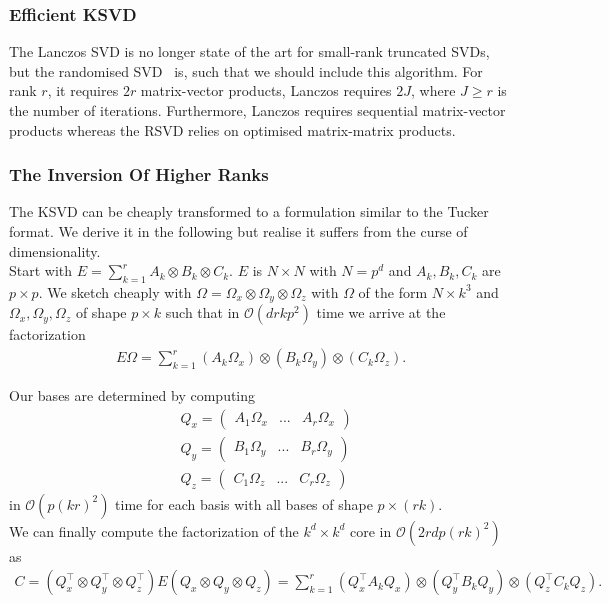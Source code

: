 \documentclass[12pt]{report}
\theoremstyle{remark}
\begin{document}
\subsubsection{Efficient KSVD}
The Lanczos SVD is no longer state of the art for small-rank truncated SVDs, but the randomised SVD~\cite{T23} is, such that we should include this algorithm. For rank $r$, it requires $2r$ matrix-vector products, Lanczos requires $2J$, where $J \geq r$ is the number of iterations. Furthermore, Lanczos requires sequential matrix-vector products whereas the RSVD relies on optimised matrix-matrix products.

\subsubsection{The Inversion Of Higher Ranks}
The KSVD can be cheaply transformed to a formulation similar to the Tucker format. We derive it in the following but realise it suffers from the curse of dimensionality. \\

Start with $E = \sum_{k=1}^r A_k \otimes B_k \otimes C_k$. $E$ is $N \times N$ with $N = p^d$ and $A_k, B_k, C_k$ are $p \times p$. We sketch cheaply with $\Omega = \Omega_x \otimes \Omega_y \otimes \Omega_z$ with $\Omega$ of the form $N \times k^3$ and $\Omega_x, \Omega_y, \Omega_z$ of shape $p \times k$ such that in $\mathcal{O}(dr k p^2)$ time we arrive at the factorization
\begin{align}
E \Omega = \sum_{k=1}^r (A_k \Omega_x) \otimes (B_k \Omega_y) \otimes (C_k \Omega_z).
\end{align}

Our bases are determined by computing
\begin{align*}
&Q_x = \begin{pmatrix}A_1 \Omega_x & ... & A_r \Omega_x \end{pmatrix}
\\
&Q_y = \begin{pmatrix}B_1 \Omega_y & ... & B_r \Omega_y \end{pmatrix}
\\
&Q_z = \begin{pmatrix}C_1 \Omega_z & ... & C_r \Omega_z \end{pmatrix}
\end{align*}
in $\mathcal{O}(p (kr)^2)$ time for each basis with all bases of shape $p \times (rk)$. \\

We can finally compute the factorization of the $k^d \times k^d$ core in $\mathcal{O}(2rd p (rk)^2)$ as 
\begin{align*}
C = (Q_x^\top \otimes Q_y^\top \otimes Q_z^\top) E (Q_x \otimes Q_y \otimes Q_z) = \sum_{k=1}^r (Q_x^\top A_k Q_x) \otimes (Q_y^\top B_k Q_y) \otimes (Q_z^\top C_k Q_z).
\end{align*}
\end{document}
